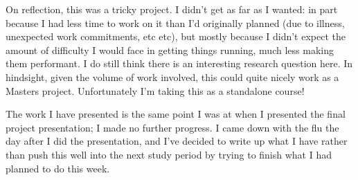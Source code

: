 \documentclass[twocolumn,11pt]{extarticle}
\begin{document}
On reflection, this was a tricky project. I didn't get as far as I wanted: in part because I had less time to work on it than I'd originally planned (due to illness, unexpected work commitments, etc etc), but mostly because I didn't expect the amount of difficulty I would face in getting things running, much less making them performant. I do still think there is an interesting research question here. In hindsight, given the volume of work involved, this could quite nicely work as a Masters project. Unfortunately I'm taking this as a standalone course!  

The work I have presented is the same point I was at when I presented the final project presentation; I made no further progress. I came down with the flu the day after I did the presentation, and I've decided to write up what I have rather than push this well into the next study period by trying to finish what I had planned to do this week.


\newpage
\printbibliography
\newpage
\onecolumn
\end{document}
